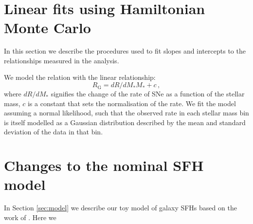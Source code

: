 \documentclass[fleqn,usenatbib]{mnras}
\begin{document}








\appendix

\section{Linear fits using Hamiltonian Monte Carlo}
In this section we describe the procedures used to fit slopes and intercepts to the relationships measured in the analysis.

\label{appendix:linear_fits}
We model the relation with the linear relationship: 
\begin{equation}
    R_{\mathrm{G}} = dR/dM_* M_* + c \,,
\label{eq:rate_fit}
\end{equation}
where $dR/dM_*$ signifies the change of the rate of SNe as a function of the stellar mass, $c$ is a constant that sets the normalisation of the rate. We fit the model assuming a normal likelihood, such that the observed rate in each stellar mass bin is itself modelled as a Gaussian distribution described by the mean and standard deviation of the data in that bin.

\section{Changes to the nominal SFH model}

In Section \ref{sec:model} we describe our toy model of galaxy SFHs based on the work of \citet{Childress2014}. Here we 

\label{appendix:linear_fits}


\bsp	%
\label{lastpage}
\end{document}
